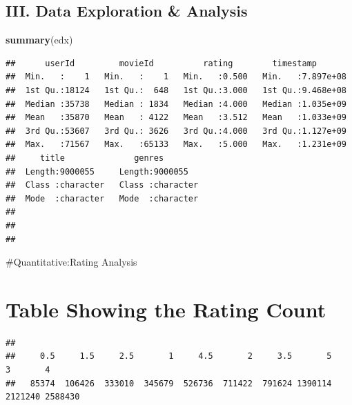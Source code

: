 \documentclass[
]{article}
\newenvironment{Shaded}{\begin{snugshade}}{\end{snugshade}}
\newcommand{\DecValTok}[1]{\textcolor[rgb]{0.00,0.00,0.81}{#1}}
\newcommand{\KeywordTok}[1]{\textcolor[rgb]{0.13,0.29,0.53}{\textbf{#1}}}
\newcommand{\NormalTok}[1]{#1}
\newcommand{\OperatorTok}[1]{\textcolor[rgb]{0.81,0.36,0.00}{\textbf{#1}}}
\begin{document}
\hypertarget{iii.-data-exploration-analysis}{%
\subsection{III. Data Exploration \&
Analysis}\label{iii.-data-exploration-analysis}}

\begin{Shaded}
\begin{Highlighting}[]
\KeywordTok{summary}\NormalTok{(edx)}
\end{Highlighting}
\end{Shaded}

\begin{verbatim}
##      userId         movieId          rating        timestamp        
##  Min.   :    1   Min.   :    1   Min.   :0.500   Min.   :7.897e+08  
##  1st Qu.:18124   1st Qu.:  648   1st Qu.:3.000   1st Qu.:9.468e+08  
##  Median :35738   Median : 1834   Median :4.000   Median :1.035e+09  
##  Mean   :35870   Mean   : 4122   Mean   :3.512   Mean   :1.033e+09  
##  3rd Qu.:53607   3rd Qu.: 3626   3rd Qu.:4.000   3rd Qu.:1.127e+09  
##  Max.   :71567   Max.   :65133   Max.   :5.000   Max.   :1.231e+09  
##     title              genres         
##  Length:9000055     Length:9000055    
##  Class :character   Class :character  
##  Mode  :character   Mode  :character  
##                                       
##                                       
## 
\end{verbatim}

\#Quantitative:Rating Analysis

\hypertarget{table-showing-the-rating-count}{%
\section{Table Showing the Rating
Count}\label{table-showing-the-rating-count}}

\begin{Shaded}
\end{Shaded}

\begin{verbatim}
## 
##     0.5     1.5     2.5       1     4.5       2     3.5       5       3       4 
##   85374  106426  333010  345679  526736  711422  791624 1390114 2121240 2588430
\end{verbatim}
\end{document}
